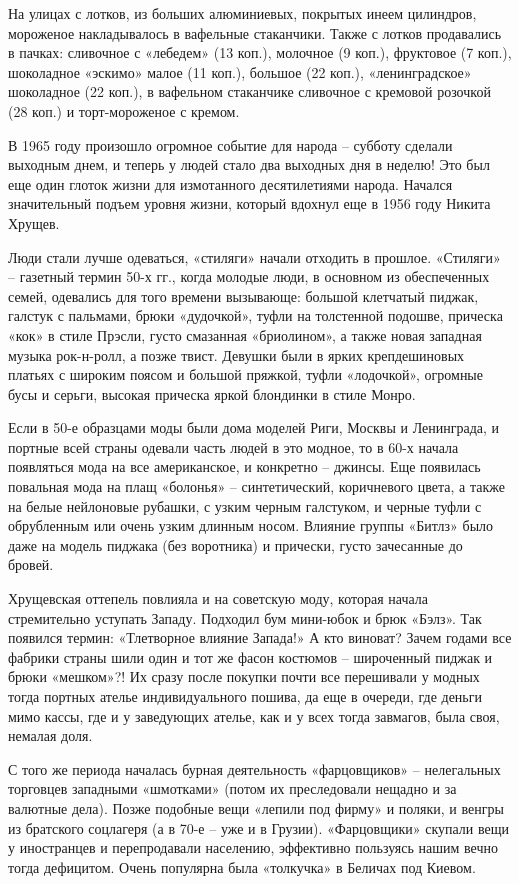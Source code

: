На улицах с лотков, из больших алюминиевых, покрытых инеем цилиндров, мороженое
накладывалось в вафельные стаканчики. Также с лотков продавались в пачках:
сливочное с «лебедем» (13 коп.), молочное (9 коп.), фруктовое (7 коп.),
шоколадное «эскимо» малое (11 коп.), большое (22 коп.), «ленинградское»
шоколадное (22 коп.), в вафельном стаканчике сливочное с кремовой розочкой (28
коп.) и торт-мороженое с кремом. 

В 1965 году произошло огромное событие для народа – субботу сделали выходным
днем, и теперь у людей стало два выходных дня в неделю! Это был еще один глоток
жизни для измотанного десятилетиями народа. Начался значительный подъем уровня
жизни, который вдохнул еще в 1956 году Никита Хрущев.

Люди стали лучше одеваться, «стиляги» начали отходить в прошлое. «Стиляги» –
газетный термин 50-х гг., когда молодые люди, в основном из обеспеченных семей,
одевались для того времени вызывающе: большой клетчатый пиджак, галстук с
пальмами, брюки «дудочкой», туфли на толстенной подошве, прическа «кок» в стиле
Прэсли, густо смазанная «бриолином», а также новая западная музыка рок-н-ролл,
а позже твист. Девушки были в ярких крепдешиновых платьях с широким поясом и
большой пряжкой, туфли «лодочкой», огромные бусы и серьги, высокая прическа
яркой блондинки в стиле Монро.

Если в 50-е образцами моды были дома моделей Риги, Москвы и Ленинграда, и
портные всей страны одевали часть людей в это модное, то в 60-х начала
появляться мода на все американское, и конкретно – джинсы. Еще появилась
повальная мода на плащ «болонья» – синтетический, коричневого цвета, а также на
белые нейлоновые рубашки, с узким черным галстуком, и черные туфли с
обрубленным или очень узким длинным носом. Влияние группы «Битлз» было даже на
модель пиджака (без воротника) и прически, густо зачесанные до бровей.

Хрущевская оттепель повлияла и на советскую моду, которая начала стремительно
уступать Западу. Подходил бум мини-юбок и брюк «Бэлз». Так появился термин:
«Тлетворное влияние Запада!» А кто виноват? Зачем годами все фабрики страны
шили один и тот же фасон костюмов – широченный пиджак и брюки «мешком»?! Их
сразу после покупки почти все перешивали у модных тогда портных ателье
индивидуального пошива, да еще в очереди, где деньги мимо кассы, где и у
заведующих ателье, как и у всех тогда завмагов, была своя, немалая доля.

С того же периода началась бурная деятельность «фарцовщиков» – нелегальных
торговцев западными «шмотками» (потом их преследовали нещадно и за валютные
дела). Позже подобные вещи «лепили под фирму» и поляки, и венгры из братского
соцлагеря (а в 70-е – уже и в Грузии). «Фарцовщики» скупали вещи у иностранцев
и перепродавали населению, эффективно пользуясь нашим вечно тогда дефицитом.
Очень популярна была «толкучка» в Беличах под Киевом.

